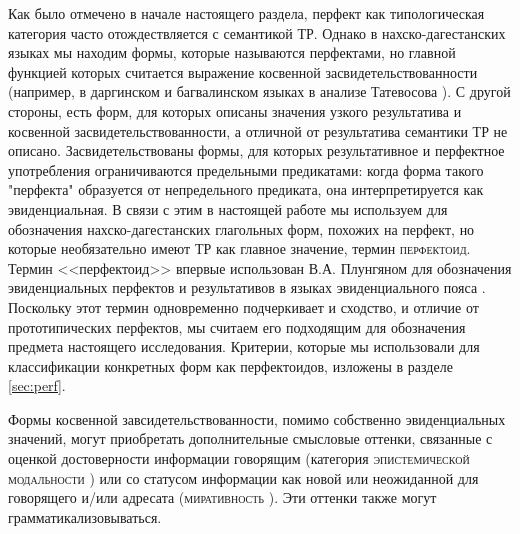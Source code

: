 \par Как было отмечено в начале настоящего раздела, перфект как типологическая категория часто отождествляется с семантикой ТР. Однако в нахско-дагестанских языках мы находим формы, которые называются перфектами, но главной функцией которых считается выражение косвенной засвидетельствованности (например, в даргинском и багвалинском языках в анализе Татевосова \citep[446]{tatevosov2001}). С другой стороны, есть форм, для которых описаны значения узкого результатива и косвенной засвидетельствованности, а отличной от результатива семантики ТР не описано. 
Засвидетельствованы формы, для которых результативное и перфектное употребления ограничиваются предельными предикатами: когда форма такого "перфекта" образуется от непредельного предиката, она интерпретируется как эвиденциальная.
\label{perfectoidpage} В связи с этим в настоящей работе мы используем для обозначения нахско-дагестанских глагольных форм, похожих на перфект, но которые необязательно имеют ТР как главное значение, термин \textsc{перфектоид}. Термин <<перфектоид>> впервые использован В.А. Плунгяном для обозначения эвиденциальных перфектов и результативов в языках эвиденциального пояса \citep[14--15]{plungian2016}. Поскольку этот термин одновременно подчеркивает и сходство, и отличие от прототипических перфектов, мы считаем его подходящим для обозначения предмета настоящего исследования. Критерии, которые мы использовали для классификации конкретных форм как перфектоидов, изложены в разделе \ref{sec:perf}.
\par Формы косвенной завсидетельствованности, помимо собственно эвиденциальных значений, могут приобретать дополнительные смысловые оттенки, связанные с оценкой достоверности информации говорящим (категория \textsc{эпистемической модальности} \citep[1--6]{boye2012}) или со статусом информации как новой или неожиданной для говорящего и/или адресата (\textsc{миративность} \citep[36]{delancey1997}). Эти оттенки также могут грамматикализовываться. 

